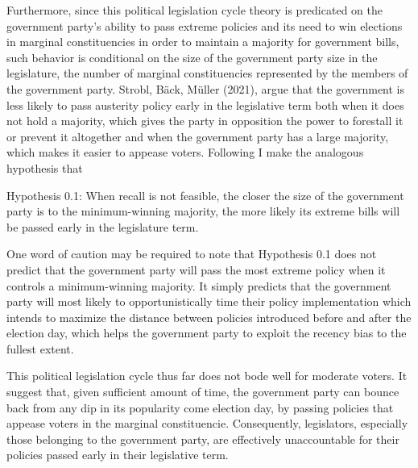 \documentclass[hyphens, crop=false]{standalone}
\begin{document}
	Furthermore,
	since
	this political legislation cycle theory is predicated on
	the government party's ability to pass extreme policies
	and its need to win elections
	in marginal constituencies
	in order to maintain a majority for government bills,
	such behavior is conditional on
	the size of the government party size in the legislature,
	the number of marginal constituencies
	represented by the members of the government party.
	Strobl, Bäck, Müller (2021),
	argue that the government is less likely to pass austerity policy
	early in the legislative term
	both when it does not hold a majority,
	which gives the party in opposition the
	power to forestall it or prevent it altogether
	and when the government party has a large majority,
	which makes it easier to appease voters.
	Following
	I make the analogous hypothesis that
	
	Hypothesis 0.1: When recall is not feasible,
	the closer the size of the government party is to the minimum-winning majority,
	the more likely its extreme bills will be passed early in the legislature term.
	
	One word of caution may be required
	to note that
	Hypothesis 0.1 does not predict that
	the government party will pass the most extreme policy
	when it controls a minimum-winning majority.
	It simply predicts that
	the government party will most likely to opportunistically
	time their policy implementation
	which intends to maximize the distance between
	policies introduced before and after the election day,
	which helps the government party to exploit the recency bias
	to the fullest extent.
	
	This political legislation cycle thus
	far does not bode well for moderate voters.
	It suggest that,
	given sufficient amount of time,
	the government party can bounce back from
	any dip in its popularity come election day,
	by passing policies that appease voters in the marginal constituencie.
	Consequently,
	legislators, especially those belonging to the government party,
	are effectively unaccountable for their policies
	passed early in their legislative term.
	
	
	
	
\end{document}
